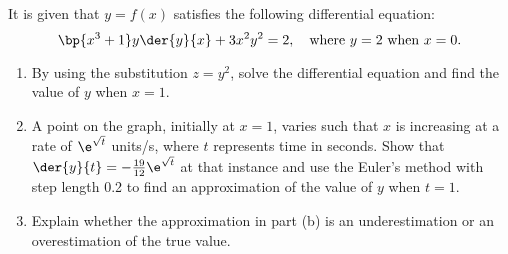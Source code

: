 \begin{problem}
    It is given that $y = f(x)$ satisfies the following differential equation: \[\bp{x^3 + 1} y \der{y}{x} + 3 x^2 y^2 = 2, \quad \text{where $y = 2$ when $x = 0$}.\]

    \begin{enumerate}
        \item By using the substitution $z = y^2$, solve the differential equation and find the value of $y$ when $x = 1$.
        \item A point on the graph, initially at $x = 1$, varies such that $x$ is increasing at a rate of $\e^{\sqrt t}$ units/s, where $t$ represents time in seconds. Show that $\der{y}{t} = -\frac{19}{12} \e^{\sqrt t}$ at that instance and use the Euler's method with step length 0.2 to find an approximation of the value of $y$ when $t = 1$.
        \item Explain whether the approximation in part (b) is an underestimation or an overestimation of the true value.
    \end{enumerate}
\end{problem}
